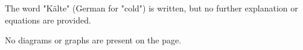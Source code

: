 The word "Kälte" (German for "cold") is written, but no further explanation or equations are provided.  

No diagrams or graphs are present on the page.